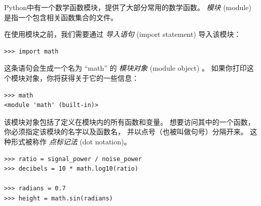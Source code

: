 
Python中有一个数学函数模块，提供了大部分常用的数学函数。
{\em 模块} (module) 是指一个包含相关函数集合的文件。
  
  


在使用模块之前，我们需要通过 {\em 导入语句} (import statement) 导入该模块：

\begin{lstlisting}
>>> import math
\end{lstlisting}

%

这条语句会生成一个名为 ``math'' 的 {\em 模块对象} (module object) 。
如果你打印这个模块对象，你将获得关于它的一些信息：


\begin{lstlisting}
>>> math
<module 'math' (built-in)>
\end{lstlisting}

%

该模块对象包括了定义在模块内的所有函数和变量。
想要访问其中的一个函数，你必须指定该模块的名字以及函数名，
并以点号（也被叫做句号）分隔开来。 这种形式被称作 {\em 点标记法} (dot
notation)。
  

\begin{lstlisting}
>>> ratio = signal_power / noise_power
>>> decibels = 10 * math.log10(ratio)

>>> radians = 0.7
>>> height = math.sin(radians)
\end{lstlisting}

%

